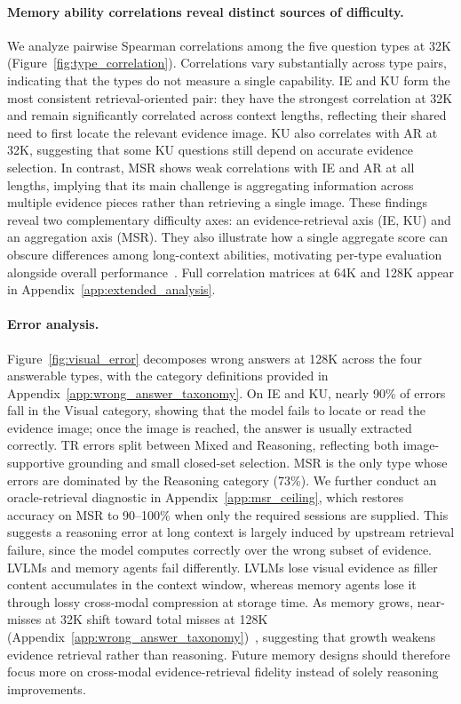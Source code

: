 \documentclass{article}
\begin{document}
\paragraph{Memory ability correlations reveal distinct sources of difficulty.}
We analyze pairwise Spearman correlations among the five question types at 32K (Figure~\ref{fig:type_correlation}). Correlations vary substantially across type pairs, indicating that the types do not measure a single capability. IE and KU form the most consistent retrieval-oriented pair: they have the strongest correlation at 32K and remain significantly correlated across context lengths, reflecting their shared need to first locate the relevant evidence image. KU also correlates with AR at 32K, suggesting that some KU questions still depend on accurate evidence selection. In contrast, MSR shows weak correlations with IE and AR at all lengths, implying that its main challenge is aggregating information across multiple evidence pieces rather than retrieving a single image. These findings reveal two complementary difficulty axes: an evidence-retrieval axis (IE, KU) and an aggregation axis (MSR). They also illustrate how a single aggregate score can obscure differences among long-context abilities, motivating per-type evaluation alongside overall performance~\cite{hsiehruler,yen2024helmet}. Full correlation matrices at 64K and 128K appear in Appendix~\ref{app:extended_analysis}.

\paragraph{Error analysis.}
Figure~\ref{fig:visual_error} decomposes wrong answers at 128K across the four answerable types, with the category definitions provided in Appendix~\ref{app:wrong_answer_taxonomy}. On IE and KU, nearly 90\% of errors fall in the Visual category, showing that the model fails to locate or read the evidence image; once the image is reached, the answer is usually extracted correctly. TR errors split between Mixed and Reasoning, reflecting both image-supportive grounding and small closed-set selection. MSR is the only type whose errors are dominated by the Reasoning category (73\%). We further conduct an oracle-retrieval diagnostic in Appendix~\ref{app:msr_ceiling}, which restores accuracy on MSR to 90--100\% when only the required sessions are supplied. This suggests a reasoning error at long context is largely induced by upstream retrieval failure, since the model computes correctly over the wrong subset of evidence. LVLMs and memory agents fail differently. LVLMs lose visual evidence as filler content accumulates in the context window, whereas memory agents lose it through lossy cross-modal compression at storage time. As memory grows, near-misses at 32K shift toward total misses at 128K (Appendix~\ref{app:wrong_answer_taxonomy})~\cite{levy2024same}, suggesting that growth weakens evidence retrieval rather than reasoning. Future memory designs should therefore focus more on cross-modal evidence-retrieval fidelity instead of solely reasoning improvements.
\end{document}
